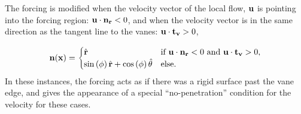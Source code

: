 %
%



The forcing is modified when the velocity vector of the local flow, ${\bf u}$ 
is pointing into the forcing region: ${\bf u} \cdot {\bf n_r} < 0$, and
when the velocity vector is in the same direction as the tangent line to
the vanes: $ {\bf u} \cdot {\bf t_v} > 0 $, 

\begin{equation}
 {\bf n}({\bf x}) = 
 \begin{cases} 
   \hat {\bf r}  & \text{if } {\bf u} \cdot {\bf n_r} < 0 \text{ and }  {\bf u} \cdot {\bf t_v} > 0  ,\\
   \sin \left(\phi \right) \hat{{\bf r}}+ \cos \left(\phi \right) \hat{{\bf \theta}}  & \text{else}.
 \end{cases}
\end{equation}
%
In these instances, the
forcing acts as if there was a rigid surface past the vane edge, and
gives the appearance of a special ``no-penetration'' condition for the
velocity for these cases. 

